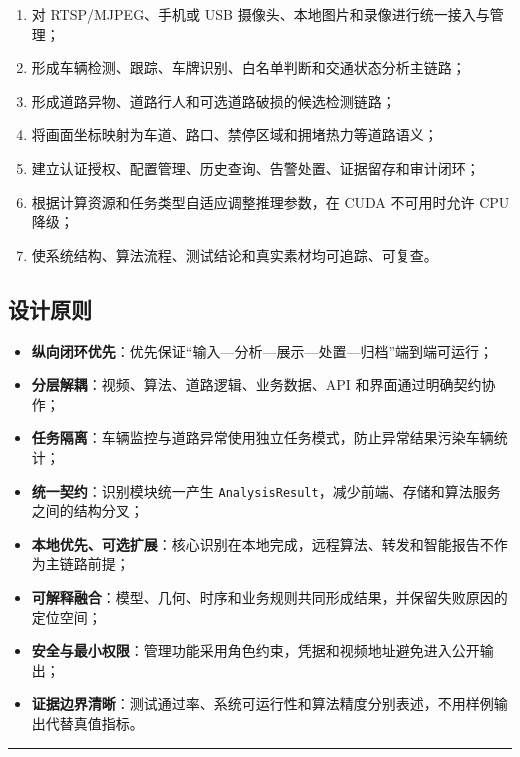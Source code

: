\begin{enumerate}
\def\labelenumi{\arabic{enumi}.}
\tightlist
\item
  对 RTSP/MJPEG、手机或 USB 摄像头、本地图片和录像进行统一接入与管理；
\item
  形成车辆检测、跟踪、车牌识别、白名单判断和交通状态分析主链路；
\item
  形成道路异物、道路行人和可选道路破损的候选检测链路；
\item
  将画面坐标映射为车道、路口、禁停区域和拥堵热力等道路语义；
\item
  建立认证授权、配置管理、历史查询、告警处置、证据留存和审计闭环；
\item
  根据计算资源和任务类型自适应调整推理参数，在 CUDA 不可用时允许 CPU 降级；
\item
  使系统结构、算法流程、测试结论和真实素材均可追踪、可复查。
\end{enumerate}

\subsection{设计原则}\label{design-ux8bbeux8ba1ux539fux5219}

\begin{itemize}
\tightlist
\item
  \textbf{纵向闭环优先}：优先保证``输入---分析---展示---处置---归档''端到端可运行；
\item
  \textbf{分层解耦}：视频、算法、道路逻辑、业务数据、API 和界面通过明确契约协作；
\item
  \textbf{任务隔离}：车辆监控与道路异常使用独立任务模式，防止异常结果污染车辆统计；
\item
  \textbf{统一契约}：识别模块统一产生 \texttt{Analysis\allowbreak{}Result}，减少前端、存储和算法服务之间的结构分叉；
\item
  \textbf{本地优先、可选扩展}：核心识别在本地完成，远程算法、转发和智能报告不作为主链路前提；
\item
  \textbf{可解释融合}：模型、几何、时序和业务规则共同形成结果，并保留失败原因的定位空间；
\item
  \textbf{安全与最小权限}：管理功能采用角色约束，凭据和视频地址避免进入公开输出；
\item
  \textbf{证据边界清晰}：测试通过率、系统可运行性和算法精度分别表述，不用样例输出代替真值指标。
\end{itemize}

\begin{center}\rule{0.5\linewidth}{0.5pt}\end{center}

